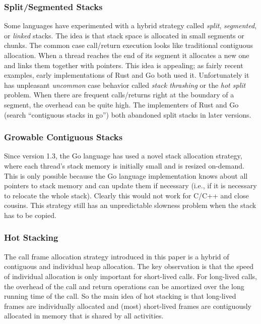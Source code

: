 \documentclass[sigplan,10pt,review,anonymous]{acmart}\settopmatter{printfolios=true,printccs=false,printacmref=false}
\begin{document}
\subsubsection{Split/Segmented Stacks}

Some languages have experimented with a hybrid strategy called \emph{split}, \emph{segmented}, or \emph{linked} stacks.
The idea is that stack space is allocated in small segments or chunks.
The common case call/return execution looks like traditional contiguous allocation.
When a thread reaches the end of its segment it allocates a new one and links them together with pointers.
This idea is appealing; as fairly recent examples, early implementations of Rust and Go both used it.
Unfortunately it has unpleasant \emph{uncommon} case behavior called \emph{stack thrashing} or the \emph{hot split} problem.
When there are frequent calls/returns right at the boundary of a segment, the overhead can be quite high.
The implementers of Rust \cite{Anderson2013} and Go (search ``contiguous stacks in go'') both abandoned split stacks in later versions.


\subsubsection{Growable Contiguous Stacks}

Since version 1.3, the Go language has used a novel stack allocation strategy, where each thread's stack memory is initially small and is resized on-demand.
This is only possible because the Go language implementation knows about all pointers to stack memory and can update them if necessary (i.e., if it is necessary to relocate the whole stack).
Clearly this would not work for C/C++ and close cousins.
This strategy still has an unpredictable slowness problem when the stack has to be copied.

\subsubsection{Hot Stacking}

The call frame allocation strategy introduced in this paper is a hybrid of contiguous and individual heap allocation.
The key observation is that the speed of individual allocation is only important for short-lived calls.
For long-lived calls, the overhead of the call and return operations can be amortized over the long running time of the call.
So the main idea of hot stacking is that long-lived frames are individually allocated and (most) short-lived frames are contiguously allocated in memory that is shared by all activities.
\end{document}

